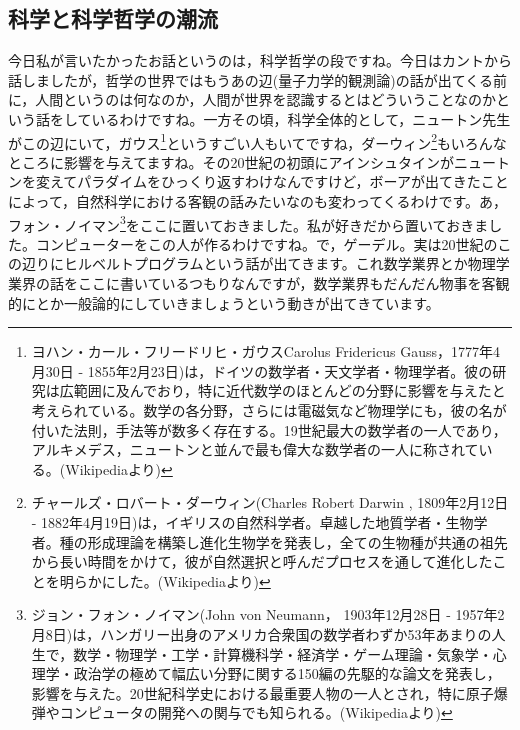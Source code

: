 \documentclass{ltjsbook}
\begin{document}
\subsection{科学と科学哲学の潮流}
今日私が言いたかったお話というのは，科学哲学の段ですね。今日はカントから話しましたが，哲学の世界ではもうあの辺(量子力学的観測論)の話が出てくる前に，人間というのは何なのか，人間が世界を認識するとはどういうことなのかという話をしているわけですね。一方その頃，科学全体的として，ニュートン先生がこの辺にいて，ガウス\footnote{ヨハン・カール・フリードリヒ・ガウスCarolus Fridericus Gauss，1777年4月30日 - 1855年2月23日)は，ドイツの数学者・天文学者・物理学者。彼の研究は広範囲に及んでおり，特に近代数学のほとんどの分野に影響を与えたと考えられている。数学の各分野，さらには電磁気など物理学にも，彼の名が付いた法則，手法等が数多く存在する。19世紀最大の数学者の一人であり，アルキメデス，ニュートンと並んで最も偉大な数学者の一人に称されている。(Wikipediaより)}というすごい人もいてですね，ダーウィン\footnote{チャールズ・ロバート・ダーウィン(Charles Robert Darwin , 1809年2月12日 - 1882年4月19日)は，イギリスの自然科学者。卓越した地質学者・生物学者。種の形成理論を構築し進化生物学を発表し，全ての生物種が共通の祖先から長い時間をかけて，彼が自然選択と呼んだプロセスを通して進化したことを明らかにした。(Wikipediaより)}もいろんなところに影響を与えてますね。その20世紀の初頭にアインシュタインがニュートンを変えてパラダイムをひっくり返すわけなんですけど，ボーアが出てきたことによって，自然科学における客観の話みたいなのも変わってくるわけです。あ，フォン・ノイマン\footnote{ジョン・フォン・ノイマン(John von Neumann， 1903年12月28日 - 1957年2月8日)は，ハンガリー出身のアメリカ合衆国の数学者わずか53年あまりの人生で，数学・物理学・工学・計算機科学・経済学・ゲーム理論・気象学・心理学・政治学の極めて幅広い分野に関する150編の先駆的な論文を発表し，影響を与えた。20世紀科学史における最重要人物の一人とされ，特に原子爆弾やコンピュータの開発への関与でも知られる。(Wikipediaより)}をここに置いておきました。私が好きだから置いておきました。コンピューターをこの人が作るわけですね。で，ゲーデル。実は20世紀のこの辺りにヒルベルトプログラムという話が出てきます。これ数学業界とか物理学業界の話をここに書いているつもりなんですが，数学業界もだんだん物事を客観的にとか一般論的にしていきましょうという動きが出てきています。
\end{document}

